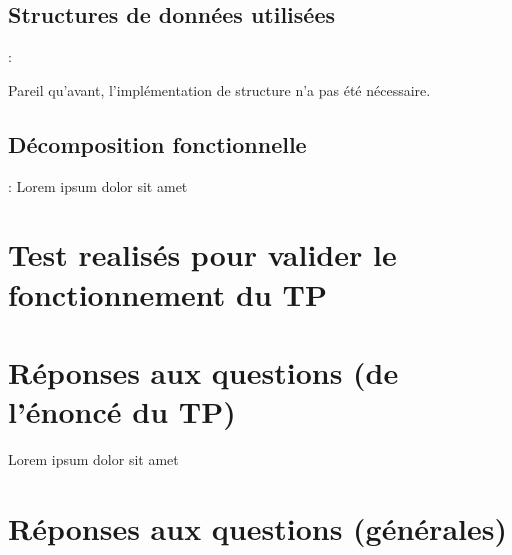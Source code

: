 \documentclass{beamer}
\newcommand{\sn}{\secname}
\newcommand{\ssn}{\subsecname}
\begin{document}
%
\subsection{Structures de données utilisées}
\begin{frame}{\sn : \ssn}

Pareil qu'avant, l'implémentation de structure n'a pas été nécessaire.
    
\end{frame}
%

%
\subsection{Décomposition fonctionnelle}
\begin{frame}{\sn : \ssn}
    Lorem ipsum dolor sit amet
\end{frame}

%
%
\section{Test realisés pour valider le fonctionnement du TP}
\begin{frame}{\sn}
%

\end{frame}
%
\section{Réponses aux questions (de l'énoncé du TP)}
\begin{frame}{\secname}
%
    Lorem ipsum dolor sit amet

    
\end{frame}

\section{Réponses aux questions (générales)}

\begin{frame}{\secname}
    
\end{frame}
\end{document}
